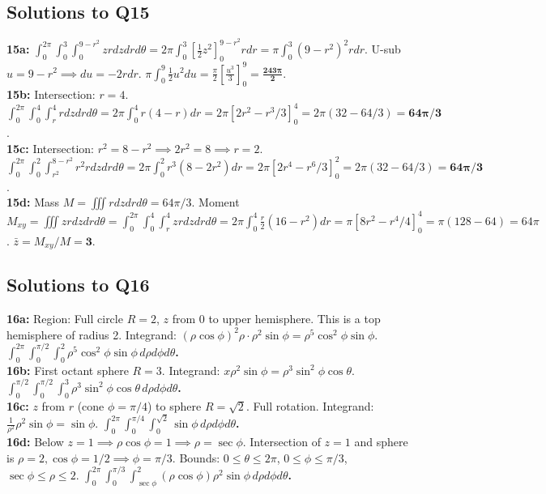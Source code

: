 \documentclass[11pt]{article}
\begin{document}
\subsection{Solutions to Q15}
\textbf{15a:} $\int_0^{2\pi} \int_0^3 \int_0^{9-r^2} z r dz dr d\theta = 2\pi \int_0^3 [\frac{1}{2}z^2]_0^{9-r^2} r dr = \pi \int_0^3 (9-r^2)^2 r dr$. U-sub $u=9-r^2 \implies du=-2rdr$. $\pi \int_0^9 \frac{1}{2}u^2 du = \frac{\pi}{2}[\frac{u^3}{3}]_0^9 = \mathbf{\frac{243\pi}{2}}$.\\
\textbf{15b:} Intersection: $r=4$. $\int_0^{2\pi} \int_0^4 \int_r^4 r dz dr d\theta = 2\pi \int_0^4 r(4-r) dr = 2\pi [2r^2 - r^3/3]_0^4 = 2\pi(32 - 64/3) = \mathbf{64\pi/3}$.\\
\textbf{15c:} Intersection: $r^2 = 8-r^2 \implies 2r^2=8 \implies r=2$. $\int_0^{2\pi} \int_0^2 \int_{r^2}^{8-r^2} r^2 r dz dr d\theta = 2\pi \int_0^2 r^3(8-2r^2) dr = 2\pi[2r^4 - r^6/3]_0^2 = 2\pi(32 - 64/3) = \mathbf{64\pi/3}$.\\
\textbf{15d:} Mass $M = \iiint r dz dr d\theta = 64\pi/3$. Moment $M_{xy} = \iiint z r dz dr d\theta = \int_0^{2\pi} \int_0^4 \int_r^4 z r dz dr d\theta = 2\pi \int_0^4 \frac{r}{2}(16-r^2) dr = \pi [8r^2 - r^4/4]_0^4 = \pi(128 - 64) = 64\pi$. $\bar{z} = M_{xy} / M = \mathbf{3}$.

\subsection{Solutions to Q16}
\textbf{16a:} Region: Full circle $R=2$, $z$ from 0 to upper hemisphere. This is a top hemisphere of radius 2. Integrand: $(\rho\cos\phi)^2 \rho \cdot \rho^2\sin\phi = \rho^5\cos^2\phi\sin\phi$. \textbf{$\int_0^{2\pi} \int_0^{\pi/2} \int_0^2 \rho^5 \cos^2\phi \sin\phi \, d\rho d\phi d\theta$.}\\
\textbf{16b:} First octant sphere $R=3$. Integrand: $x \rho^2\sin\phi = \rho^3\sin^2\phi\cos\theta$. \textbf{$\int_0^{\pi/2} \int_0^{\pi/2} \int_0^3 \rho^3\sin^2\phi\cos\theta \, d\rho d\phi d\theta$.}\\
\textbf{16c:} $z$ from $r$ (cone $\phi=\pi/4$) to sphere $R=\sqrt{2}$. Full rotation. Integrand: $\frac{1}{\rho^2} \rho^2\sin\phi = \sin\phi$. \textbf{$\int_0^{2\pi} \int_0^{\pi/4} \int_0^{\sqrt{2}} \sin\phi \, d\rho d\phi d\theta$.}\\
\textbf{16d:} Below $z=1 \implies \rho\cos\phi = 1 \implies \rho = \sec\phi$. Intersection of $z=1$ and sphere is $\rho=2, \cos\phi = 1/2 \implies \phi = \pi/3$. Bounds: $0 \le \theta \le 2\pi$, $0 \le \phi \le \pi/3$, $\sec\phi \le \rho \le 2$. \textbf{$\int_0^{2\pi} \int_0^{\pi/3} \int_{\sec\phi}^2 (\rho\cos\phi) \rho^2\sin\phi \, d\rho d\phi d\theta$.}
\end{document}
